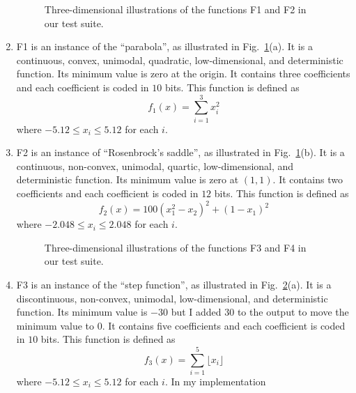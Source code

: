 \documentclass{article}
\begin{document}
\begin{enumerate}

\begin{figure}[ht]
  \centering
  \subfloat[F1]{{\texttt{[image: f1-3d]}}}
  \qquad
  \subfloat[F2]{{\texttt{[image: f2-3d]}}}  
  \caption{Three-dimensional illustrations of the functions F1 and
    F2 in our test suite.}
  \label{fig:f1f2-3d}
\end{figure}

\item F1 is an instance of the “parabola”, as illustrated in
  Fig.~\ref{fig:f1f2-3d}(a). It is a continuous, convex, unimodal,
  quadratic, low-dimensional, and deterministic function. Its minimum
  value is zero at the origin. It contains three coefficients and each
  coefficient is coded in $10$ bits. This function is defined as
\begin{equation}
f_{1}(x)=\sum_{i=1}^{3}x_{i}^{2}
\end{equation}
where $-5.12\leq x_{i}\leq 5.12$ for each $i$.

\item F2 is an instance of “Rosenbrock's saddle”, as illustrated in
  Fig.~\ref{fig:f1f2-3d}(b). It is a continuous, non-convex, unimodal,
  quartic, low-dimensional, and deterministic function. Its minimum
  value is zero at $(1,1)$. It contains two coefficients and each
  coefficient is coded in $12$ bits. This function is defined as
\begin{equation}
f_{2}(x)=100(x_{1}^{2}-x_{2})^2+(1-x_{1})^2
\end{equation}
where $-2.048\leq x_{i}\leq 2.048$ for each $i$.

\begin{figure}[ht]
  \centering
  \subfloat[F3]{{\texttt{[image: f3-3d]}}}
  \qquad
  \caption{Three-dimensional illustrations of the functions F3 and
    F4 in our test suite.}
  \label{fig:f3f4-3d}
\end{figure}

\item F3 is an instance of the “step function”, as illustrated in
  Fig.~\ref{fig:f3f4-3d}(a). It is a discontinuous, non-convex,
  unimodal, low-dimensional, and deterministic function. Its minimum
  value is $-30$ but I added $30$ to the output to move the minimum
  value to $0$. It contains five coefficients and each coefficient is
  coded in $10$ bits. This function is defined as
\begin{equation}
f_{3}(x)=\sum_{i=1}^{5}\lfloor x_{i}\rfloor
\end{equation}
where $-5.12\leq x_{i}\leq 5.12$ for each $i$. In my implementation


\end{enumerate}
\end{document}
